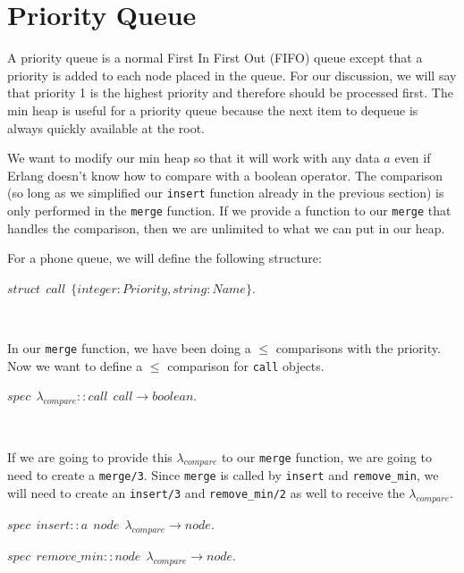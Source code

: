 \documentclass[
]{book}
\begin{document}
\hypertarget{priority-queue}{%
\section{Priority Queue}\label{priority-queue}}

A priority queue is a normal First In First Out (FIFO) queue except that a priority is added to each node placed in the queue. For our discussion, we will say that priority 1 is the highest priority and therefore should be processed first. The min heap is useful for a priority queue because the next item to dequeue is always quickly available at the root.

We want to modify our min heap so that it will work with any data \(a\) even if Erlang doesn't know how to compare with a boolean operator. The comparison (so long as we simplified our \texttt{insert} function already in the previous section) is only performed in the \texttt{merge} function. If we provide a function to our \texttt{merge} that handles the comparison, then we are unlimited to what we can put in our heap.

For a phone queue, we will define the following structure:

\begin{formulabox}
\(struct ~ ~ call ~ ~ \lbrace integer:Priority, string:Name \rbrace.\)

\end{formulabox}

\(\nonumber\)

In our \texttt{merge} function, we have been doing a \(\leq\) comparisons with the priority. Now we want to define a \(\leq\) comparison for \texttt{call} objects.

\begin{formulabox}
\(spec ~ ~ \lambda_{compare} :: call ~ ~ call \rightarrow boolean.\)

\end{formulabox}

\(\nonumber\)

If we are going to provide this \(\lambda_{compare}\) to our \texttt{merge} function, we are going to need to create a \texttt{merge/3}. Since \texttt{merge} is called by \texttt{insert} and \texttt{remove\_min}, we will need to create an \texttt{insert/3} and \texttt{remove\_min/2} as well to receive the \(\lambda_{compare}\).

\begin{formulabox}
\(spec ~ ~ insert :: a ~ ~ node ~ ~ \lambda_{compare} \rightarrow node.\)

\(spec ~ ~ remove\_min :: node ~ ~ \lambda_{compare} \rightarrow node.\)

\end{formulabox}
\end{document}

